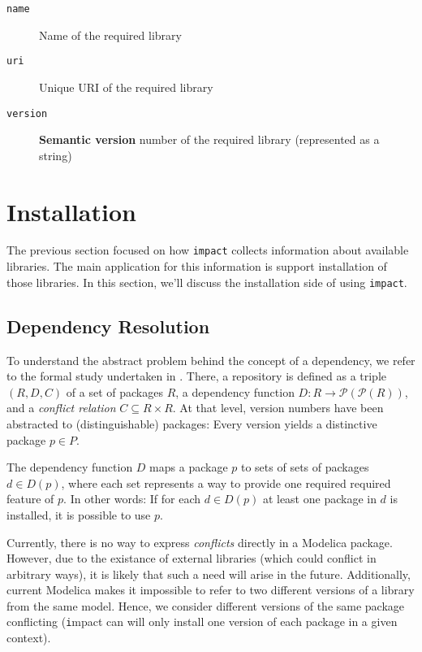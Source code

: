 \documentclass[11pt,a4paper,twocolumn]{article}
\newcommand{\code}[1]{\texttt{#1}} %
\begin{document}
\begin{description}
  \item[\code{name}] Name of the required library
  \item[\code{uri}] Unique URI of the required library
  \item[\code{version}] {\bf Semantic version} number of the required
    library (represented as a string)
\end{description}

\section{Installation}

The previous section focused on how \code{impact} collects information
about available libraries.  The main application for this information
is support installation of those libraries.  In this section, we'll
discuss the installation side of using \code{impact}.

\subsection{Dependency Resolution}

To understand the abstract problem behind the concept of a dependency,
we refer to the formal study undertaken in \cite{boender2011formal}.
There, a repository is defined as a triple $(R,D,C)$ of a set of
packages $R$, a dependency function $D : R \rightarrow
\mathcal{P}(\mathcal{P}(R))$, and a {\em conflict relation} $C
\subseteq R \times R$.  At that level, version numbers have been
abstracted to (distinguishable) packages: Every version yields a
distinctive package $p \in P$.

The dependency function $D$ maps a package $p$ to sets of sets of
packages $d \in D(p)$, where each set represents a way to provide one
required required feature of $p$.  In other words: If for each $d \in
D(p)$ at least one package in $d$ is installed, it is possible to use
$p$.

Currently, there is no way to express {\em conflicts} directly in a
Modelica package.  However, due to the existance of external libraries
(which could conflict in arbitrary ways), it is likely that such a
need will arise in the future.  Additionally, current Modelica makes
it impossible to refer to two different versions of a library from the
same model.  Hence, we consider different versions of the same package
conflicting ({\code impact} can will only install one version of each
package in a given context).
\end{document}
